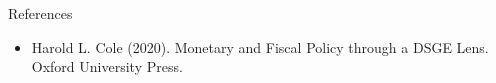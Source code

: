 \documentclass[10pt,c,aspectratio=1610,handout]{beamer}
\begin{document}
\begin{frame}{References}%
  \begin{itemize}%
    \item[$\blacktriangleright$] Harold L. Cole (2020). Monetary and Fiscal Policy through a DSGE Lens. Oxford University Press.%
  \end{itemize}%
\end{frame}%
\end{document}
